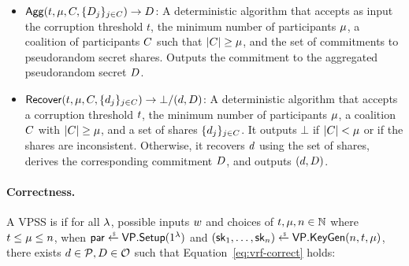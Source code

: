 \begin{definition}
\begin{itemize}
  \item $\mathsf{Agg}(t, \mu, C, \{ D_j \}_{j \in C}) \rightarrow D$:
A deterministic algorithm that accepts as input the corruption threshold $t$, the minimum number of participants $\mu$,
a coalition of participants $C$ such that $\lvert C \rvert \geq \mu$,
and the set of commitments to pseudorandom secret shares.
Outputs the commitment to the aggregated pseudorandom secret $D$.
    \item $\mathsf{Recover}(t, \mu, C, \{ d_j \}_{ j \in C}) \rightarrow \bot /  (d, D )$:
      A deterministic algorithm that accepts a corruption threshold $t$,
      the minimum number of participants $\mu$,
      a coalition $C$ with  $\lvert C \rvert \geq \mu$,
      and a set of shares  $\{ d_j \}_{j \in C}$.
      It outputs $\bot$ if $\lvert C \rvert < \mu$
      or if the shares are inconsistent.
      Otherwise, it recovers $d$ using the set of shares,
      derives the corresponding commitment $D$, and
      outputs $(d, D)$.

\end{itemize}
\end{definition}


\paragraph{Correctness.}
A VPSS is  if for all $\lambda$,
possible inputs $w$ and choices of  $t, \mu, n \in \mathbb{N}$
where $t \le \mu \le n$,
when $\pp \rgets \dvrf.\setup(1^\usecp)$
and $(\SK_1, \ldots, \SK_n) \rgets \dvrf.\keygen(n, t, \minparticipants)$,
there exists $d \in \mathcal{P}, D \in \mathcal{O}$ such that Equation~\ref{eq:vrf-correct} holds:

